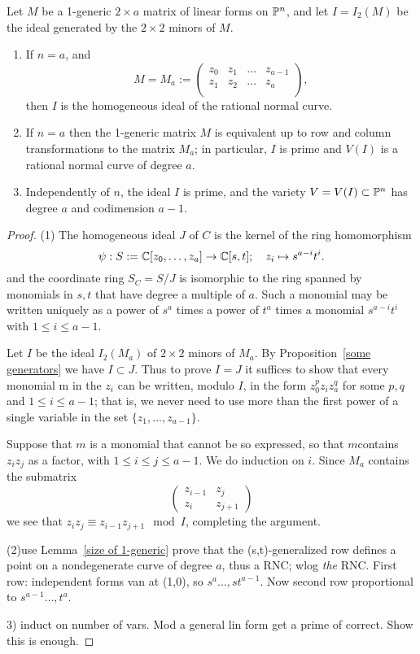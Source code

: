 \begin{theorem}Let $M$ be a 1-generic $2\times a$ matrix of linear forms on $\PP^n$, and
let $I = I_2(M)$  be the ideal generated by the $2\times 2$ minors of $M$. 
\begin{enumerate}
\item If $n=a$, and 
$$
M = M_a:= \begin{pmatrix}
 z_0&z_1&\dots&z_{a-1}\\
 z_1&z_2&\dots&z_{a}\\
\end{pmatrix},
$$
then
$I$ is the homogeneous ideal of the rational
normal curve.

\item If $n = a$ then the 1-generic matrix
$M$ is equivalent up to row and column transformations to the matrix $M_{a}$;
in particular, $I$ is prime and $V(I)$ is a rational normal
curve of degree $a$.

\item Independently of $n$, the ideal $I$ is
prime, and the variety $V = V(I) \subset \PP^n$ has degree $a$ and codimension $a-1$.
\end{enumerate}

\end{theorem}

\begin{proof} (1) The homogeneous ideal $J$ of $C$ is the kernel of the ring homomorphism
$$
\psi: S:= \CC[z_0,\dots,z_a] \to \CC[s,t]; \quad z_i \mapsto s^{a-i}t^i.
$$
 and
the coordinate ring $S_C = S/J$ is isomorphic to the ring spanned by
monomials in $s,t$ that have degree a multiple of $a$. Such
a monomial may be written uniquely as a power of
$s^a$
times a power of $t^a$ times a monomial $s^{a-i}t^i$ with $1\leq i\leq a-1$.

Let $I$ be the ideal $I_2(M_a)$ of $2\times 2$ minors of $M_a$. By Proposition~\ref{some generators} we have $I\subset J$. Thus to prove $I=J$ it suffices to show that
every monomial m in the $z_i$ can be written, modulo $I$, in the form
$z_0^pz_iz_a^q$ for some $p,q$ and $1\leq i\leq a-1$; that is, we never need to
use more than the first power of a single variable in the set $\{z_1,\dots, z_{a-1}\}$.

Suppose that $m$ is a monomial that cannot be so expressed, so that $m$contains $z_iz_j$ as a factor, with $1\leq i\leq j\leq a-1$. We do induction on $i$. Since
$M_a$ contains the submatrix
$$
\begin{pmatrix}
 z_{i-1} & z_{j}\\
 z_i & z_{j+1}
\end{pmatrix}
$$
we see that $z_iz_j \equiv z_{i-1}z_{j+1} \mod I$, completing the argument.

(2)use Lemma~\ref{size of 1-generic} prove that the (s,t)-generalized row
defines a point on a nondegenerate curve of degree $a$, thus a RNC; wlog \emph{the} RNC. First row: independent
forms van at (1,0), so $s^{a}\dots,st^{a-1}$. Now second row proportional to $s^{a-1}\dots,t^{a}$.

3) induct on number of vars. Mod a general lin form get a prime of correct. Show this is enough.

\end{proof}




